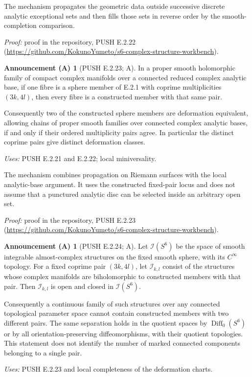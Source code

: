 \documentclass[11pt,a4paper]{article}
\theoremstyle{plain}
\theoremstyle{definition}
\newtheorem{announcement}[theorem]{Announcement (A)}
\begin{document}
The mechanism propagates the geometric data outside successive discrete analytic exceptional sets and then fills those sets in reverse order by the smooth-completion comparison.

\noindent\emph{Proof:} proof in the repository, PUSH E.2.22 (\url{https://github.com/KokunoYumeto/s6-complex-structure-workbench}).

\begin{announcement}[PUSH E.2.23; A]\label{push:E.2.23}
In a proper smooth holomorphic family of compact complex
manifolds over a connected reduced complex analytic base,
if one fibre is a sphere member of E.2.1 with coprime
multiplicities $(3k,4l)$, then every fibre is a constructed
member with that same pair.

Consequently two of the constructed sphere members are
deformation equivalent, allowing chains of proper smooth
families over connected complex analytic bases, if and
only if their ordered multiplicity pairs agree.  In
particular the distinct coprime pairs give distinct
deformation classes.
\end{announcement}
\noindent\emph{Uses:} PUSH E.2.21 and E.2.22; local miniversality.\par

The mechanism combines propagation on Riemann surfaces with the local analytic-base argument. It uses the constructed fixed-pair locus and does not assume that a punctured analytic disc can be selected inside an arbitrary open set.

\noindent\emph{Proof:} proof in the repository, PUSH E.2.23 (\url{https://github.com/KokunoYumeto/s6-complex-structure-workbench}).

\begin{announcement}[PUSH E.2.24; A]\label{push:E.2.24}
Let $\mathcal I(S^6)$ be the space of smooth integrable
almost-complex structures on the fixed smooth sphere,
with its $C^\infty$ topology.  For a fixed coprime pair
$(3k,4l)$, let $\mathcal I_{k,l}$ consist of the structures
whose complex manifolds are biholomorphic to constructed
members with that pair.  Then $\mathcal I_{k,l}$ is open
and closed in $\mathcal I(S^6)$.

Consequently a continuous family of such structures
over any connected topological parameter space cannot
contain constructed members with two different pairs.
The same separation holds in the quotient spaces by
$\operatorname{Diff}_0(S^6)$ or by all orientation-preserving
diffeomorphisms, with their quotient topologies.
This statement does not identify the number of marked
connected components belonging to a single pair.
\end{announcement}
\noindent\emph{Uses:} PUSH E.2.23 and local completeness of the deformation charts.\par
\end{document}
